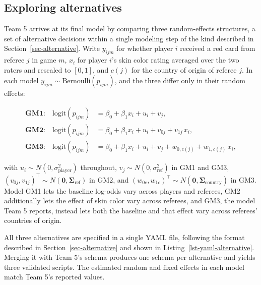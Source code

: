\documentclass[aoas]{imsart}
\begin{document}
\subsection{Exploring alternatives}\label{sec-explore}

Team 5 arrives at its final model by comparing three random-effects
structures, a set of alternative decisions within a single modeling step
of the kind described in Section~\ref{sec-alternative}. Write
\(y_{ijm}\) for whether player \(i\) received a red card from referee
\(j\) in game \(m\), \(x_i\) for player \(i\)'s skin color rating
averaged over the two raters and rescaled to \([0, 1]\), and \(c(j)\)
for the country of origin of referee \(j\). In each model
\(y_{ijm} \sim \mathrm{Bernoulli}(p_{ijm})\), and the three differ only
in their random effects:

\[
\begin{aligned}
\textbf{GM1:} \quad \mathrm{logit}(p_{ijm}) &= \beta_0 + \beta_1 x_i + u_i + v_j, \\
\textbf{GM2:} \quad \mathrm{logit}(p_{ijm}) &= \beta_0 + \beta_1 x_i + u_i + v_{0j} + v_{1j}\, x_i, \\
\textbf{GM3:} \quad \mathrm{logit}(p_{ijm}) &= \beta_0 + \beta_1 x_i + u_i + v_j + w_{0,c(j)} + w_{1,c(j)}\, x_i,
\end{aligned}
\]

with \(u_i \sim N(0, \sigma^2_{\text{player}})\) throughout,
\(v_j \sim N(0, \sigma^2_{\text{ref}})\) in GM1 and GM3,
\((v_{0j}, v_{1j})^{\top} \sim N(\mathbf{0}, \boldsymbol{\Sigma}_{\text{ref}})\)
in GM2, and
\((w_{0c}, w_{1c})^{\top} \sim N(\mathbf{0}, \boldsymbol{\Sigma}_{\text{country}})\)
in GM3. Model GM1 lets the baseline log-odds vary across players and
referees, GM2 additionally lets the effect of skin color vary across
referees, and GM3, the model Team 5 reports, instead lets both the
baseline and that effect vary across referees' countries of origin.

All three alternatives are specified in a single YAML file, following
the format described in Section~\ref{sec-alternative} and shown in
Listing~\ref{lst-yaml-alternative}. Merging it with Team 5's schema
produces one schema per alternative and yields three validated scripts.
The estimated random and fixed effects in each model match Team 5's
reported values.
\end{document}
